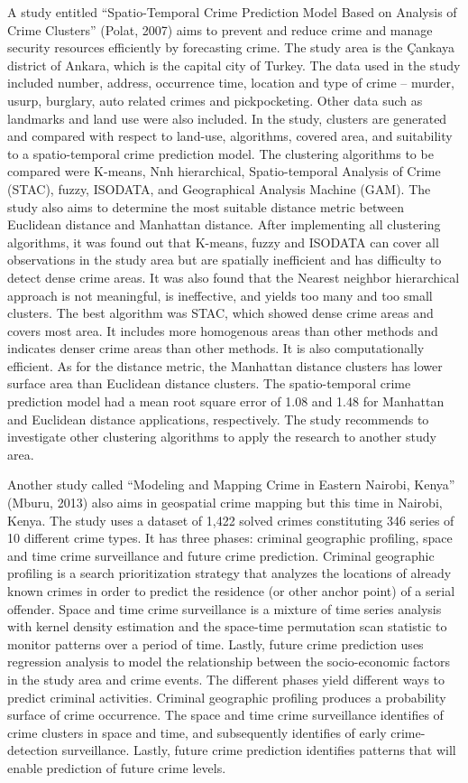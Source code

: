     A study entitled “Spatio-Temporal Crime Prediction Model Based on Analysis of Crime Clusters” (Polat, 2007) aims to prevent and reduce crime and manage security resources efficiently by forecasting crime. The study area is the Çankaya district of Ankara, which is the capital city of Turkey. The data used in the study included number, address, occurrence time, location and type of crime – murder, usurp, burglary, auto related crimes and pickpocketing. Other data such as landmarks and land use were also included. In the study, clusters are generated and compared with respect to land-use, algorithms, covered area, and suitability to a spatio-temporal crime prediction model. The clustering algorithms to be compared were K-means, Nnh hierarchical, Spatio-temporal Analysis of Crime (STAC), fuzzy, ISODATA, and Geographical Analysis Machine (GAM). The study also aims to determine the most suitable distance metric between Euclidean distance and Manhattan distance. After implementing all clustering algorithms, it was found out that K-means, fuzzy and ISODATA can cover all observations in the study area but are spatially inefficient and has difficulty to detect dense crime areas. It was also found that the Nearest neighbor hierarchical approach is not meaningful, is ineffective, and yields too many and too small clusters. The best algorithm was STAC, which showed dense crime areas and covers most area. It includes more homogenous areas than other methods and indicates denser crime areas than other methods. It is also computationally efficient. As for the distance metric, the Manhattan distance clusters has lower surface area than Euclidean distance clusters. The spatio-temporal crime prediction model had a mean root square error of 1.08 and 1.48 for Manhattan and Euclidean distance applications, respectively. The study recommends to investigate other clustering algorithms to apply the research to another study area.

    Another study called “Modeling and Mapping Crime in Eastern Nairobi, Kenya” (Mburu, 2013) also aims in geospatial crime mapping but this time in Nairobi, Kenya. The study uses a dataset of 1,422 solved crimes constituting 346 series of 10 different crime types. It has three phases: criminal geographic profiling, space and time crime surveillance and future crime prediction. Criminal geographic profiling is a search prioritization strategy that analyzes the locations of already known crimes in order to predict the residence (or other anchor point) of a serial offender. Space and time crime surveillance is a mixture of time series analysis with kernel density estimation and the space-time permutation scan statistic to monitor patterns over a period of time. Lastly, future crime prediction uses regression analysis to model the relationship between the socio-economic factors in the study area and crime events. The different phases yield different ways to predict criminal activities. Criminal geographic profiling produces a probability surface of crime occurrence. The space and time crime surveillance identifies of crime clusters in space and time, and subsequently identifies of early crime-detection surveillance. Lastly, future crime prediction identifies patterns that will enable prediction of future crime levels.

